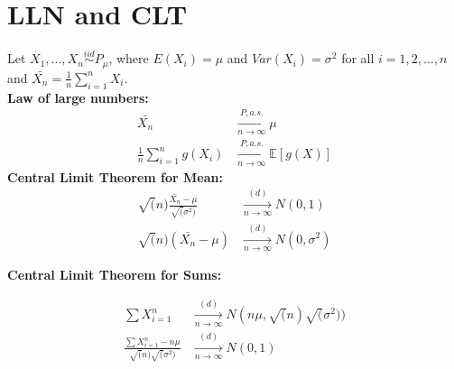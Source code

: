 \section{LLN and CLT}
Let $X_1, ..., X_n \stackrel{iid}{\sim} P_{\mu}$, where $E(X_i)=\mu$ and $Var(X_i)=\sigma^2$ for all $i=1,2,...,n$ and $\bar{X_n}= \frac{1}{n} \sum_{i=1}^{n} X_i$.\\
\textbf{Law of large numbers:}
\begin{align*}
\bar{X_n}& \xrightarrow[n \rightarrow \infty]{P, a.s.} \mu\\
\frac{1}{n} \sum_{i=1}^{n} g(X_i)& \xrightarrow[n \rightarrow \infty]{P, a.s.} \mathbb{E}[g(X)]
\end{align*}
\textbf{Central Limit Theorem for Mean:}
\begin{align*}
\sqrt(n)\frac{\bar{X_n}-\mu}{\sqrt(\sigma^2)}& \xrightarrow[n \rightarrow \infty]{(d)} N(0,1)\\
\sqrt(n)(\bar{X_n}-\mu)& \xrightarrow[n \rightarrow \infty]{(d)} N(0,\sigma^2)
\end{align*}

\textbf{Central Limit Theorem for Sums:}

\begin{align*}
\sum{X}_{i=1}^{n} & \xrightarrow[n \rightarrow \infty]{(d)} N(n \mu, \sqrt(n)\sqrt(\sigma^2))\\
\frac{\sum{X}_{i=1}^{n} - n\mu}{\sqrt(n) \sqrt(\sigma^2)} & \xrightarrow[n \rightarrow \infty]{(d)} N(0, 1)\\
\end{align*}